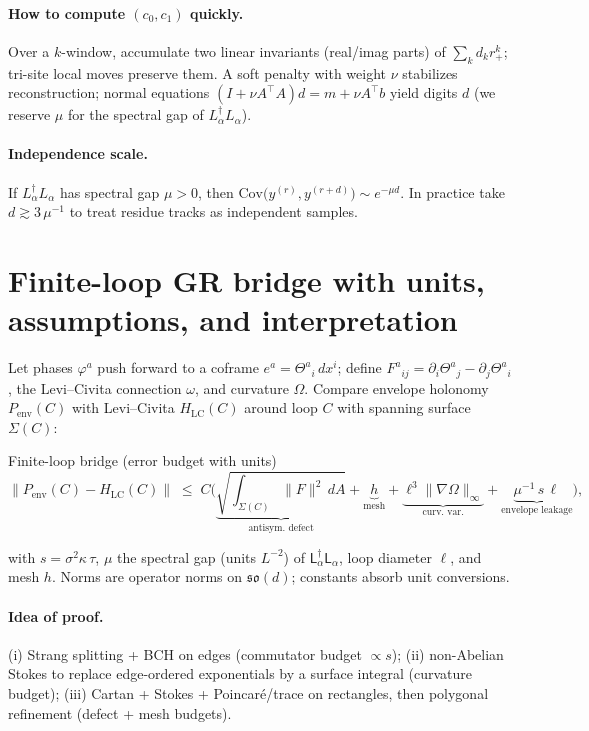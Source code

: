 \documentclass[11pt]{article}
\newcommand{\Lap}{\mathsf{L}_\alpha}
\newcommand{\Thet}{\Theta}
\newcommand{\LC}{\mathrm{LC}}
\begin{document}
\paragraph{How to compute $(c_0,c_1)$ quickly.}
Over a $k$-window, accumulate two linear invariants (real/imag parts) of $\sum_k d_k r_+^k$; tri-site local moves preserve them. A soft penalty with weight $\nu$ stabilizes reconstruction; normal equations $(I+\nu A^\top A)d=m+\nu A^\top b$ yield digits $d$ (we reserve $\mu$ for the spectral gap of $L_\alpha^\dagger L_\alpha$).  %

\paragraph{Independence scale.}
If $L_\alpha^\dagger L_\alpha$ has spectral gap $\mu>0$, then $\mathrm{Cov}\!\big(y^{(r)},y^{(r+d)}\big)\sim e^{-\mu d}$.
In practice take $d\gtrsim 3\,\mu^{-1}$ to treat residue tracks as independent samples.

\section{Finite-loop GR bridge with units, assumptions, and interpretation}
Let phases $\varphi^a$ push forward to a coframe $e^a=\Thet^a{}_i\,dx^i$; define $F^a{}_{ij}=\partial_i\Thet^a{}_j-\partial_j\Thet^a{}_i$, the Levi--Civita connection $\omega$, and curvature $\Omega$.
Compare envelope holonomy $P_{\mathrm{env}}(C)$ with Levi--Civita $H_{\LC}(C)$ around loop $C$ with spanning surface $\Sigma(C)$:
\begin{mybox}{Finite-loop bridge (error budget with units)}
\begin{equation}
\big\|P_{\mathrm{env}}(C)-H_{\LC}(C)\big\|
\;\le\;
C\Big(
\underbrace{\sqrt{\int_{\Sigma(C)}\!\!\|F\|^2\,dA}}_{\text{antisym.\ defect}}
+\underbrace{h}_{\text{mesh}}
+\underbrace{\ell^3\|\nabla\Omega\|_\infty}_{\text{curv.\ var.}}
+\underbrace{\mu^{-1}\,s\,\ell}_{\text{envelope leakage}}
\Big),
\label{eq:bridge}
\end{equation}
\end{mybox}
with $s=\sigma^2\kappa\,\tau$, $\mu$ the spectral gap (units $L^{-2}$) of $\Lap^\dagger\Lap$, loop diameter $\ell$, and mesh $h$. Norms are operator norms on $\mathfrak{so}(d)$; constants absorb unit conversions.
\paragraph{Idea of proof.} (i) Strang splitting + BCH on edges (commutator budget $\propto s$); (ii) non-Abelian Stokes to replace edge-ordered exponentials by a surface integral (curvature budget); (iii) Cartan + Stokes + Poincaré/trace on rectangles, then polygonal refinement (defect + mesh budgets). 
\end{document}
